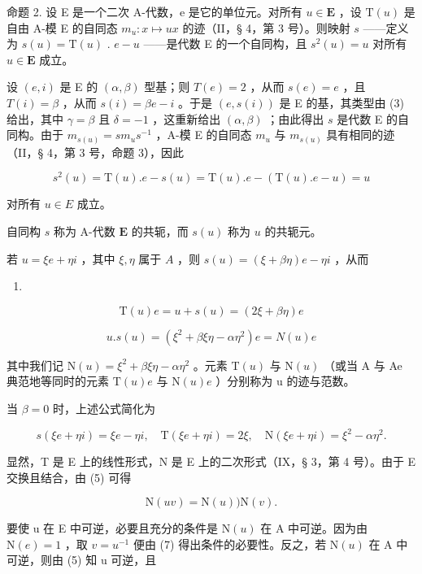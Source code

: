 命题 2. 设 E 是一个二次 A-代数，e 是它的单位元。对所有 \(u \in \mathbf{E}\) ，设 \(\mathrm{T}(u)\) 是自由 A-模 E 的自同态 \(m_u: x \mapsto ux\) 的迹（II，§ 4，第 3 号）。则映射 \(s\) ——定义为 \(s(u) = \mathrm{T}(u)\) . \(e - u\) ——是代数 E 的一个自同构，且 \(s^2(u) = u\) 对所有 \(u \in \mathbf{E}\) 成立。

设 \((e, i)\) 是 E 的 \((\alpha, \beta)\) 型基；则 \(T(e) = 2\) ，从而 \(s(e) = e\) ，且 \(T(i) = \beta\) ，从而 \(s(i) = \beta e - i\) 。于是 \((e, s(i))\) 是 E 的基，其类型由 (3) 给出，其中 \(\gamma = \beta\) 且 \(\delta = -1\) ，这重新给出 \((\alpha, \beta)\) ；由此得出 \(s\) 是代数 E 的自同构。由于 \(m_{s(u)} = sm_u s^{-1}\) ，A-模 E 的自同态 \(m_u\) 与 \(m_{s(u)}\) 具有相同的迹（II，§ 4，第 3 号，命题 3），因此

\[
s ^ {2} (u) = \mathrm{T} (u). e - s (u) = \mathrm{T} (u). e - (\mathrm{T} (u). e - u) = u
\]

对所有 \(u \in E\) 成立。

自同构 \(s\) 称为 A-代数 \(\mathbf{E}\) 的共轭，而 \(s(u)\) 称为 \(u\) 的共轭元。

若 \(u = \xi e + \eta i\) ，其中 \(\xi, \eta\) 属于 \(A\) ，则 \(s(u) = (\xi + \beta \eta)e - \eta i\) ，从而

\begin{enumerate}
\def\labelenumi{(\arabic{enumi})}
\setcounter{enumi}{3}
\tightlist
\item
\end{enumerate}

\[
\mathrm{T} (u) e = u + s (u) = (2 \xi + \beta \eta) e\tag{5}
\]

\[
u. s (u) = (\xi^ {2} + \beta \xi \eta - \alpha \eta^ {2}) e = N (u) e
\]

其中我们记 \(\mathrm{N}(u)=\xi^{2}+\beta\xi\eta-\alpha\eta^{2}\) 。元素 \(\mathrm{T}(u)\) 与 \(\mathrm{N}(u)\) （或当 A 与 Ae 典范地等同时的元素 \(\mathrm{T}(u)e\) 与 \(\mathrm{N}(u)e\) ）分别称为 u 的迹与范数。

当 \(\beta = 0\) 时，上述公式简化为

\[
s (\xi e + \eta i) = \xi e - \eta i, \quad \mathrm{T} (\xi e + \eta i) = 2 \xi , \quad \mathrm{N} (\xi e + \eta i) = \xi^ {2} - \alpha \eta^ {2}. \tag {6}
\]

显然，T 是 E 上的线性形式，N 是 E 上的二次形式（IX，§ 3，第 4 号）。由于 E 交换且结合，由 (5) 可得

\[
\mathrm{N} (u v) = \mathrm{N} (u)) \mathrm{N} (v).\tag{7}
\]

要使 u 在 E 中可逆，必要且充分的条件是 \(\mathrm{N}(u)\) 在 A 中可逆。因为由 \(\mathrm{N}(e)=1\) ，取 \(v=u^{-1}\) 便由 (7) 得出条件的必要性。反之，若 \(\mathrm{N}(u)\) 在 A 中可逆，则由 (5) 知 u 可逆，且


